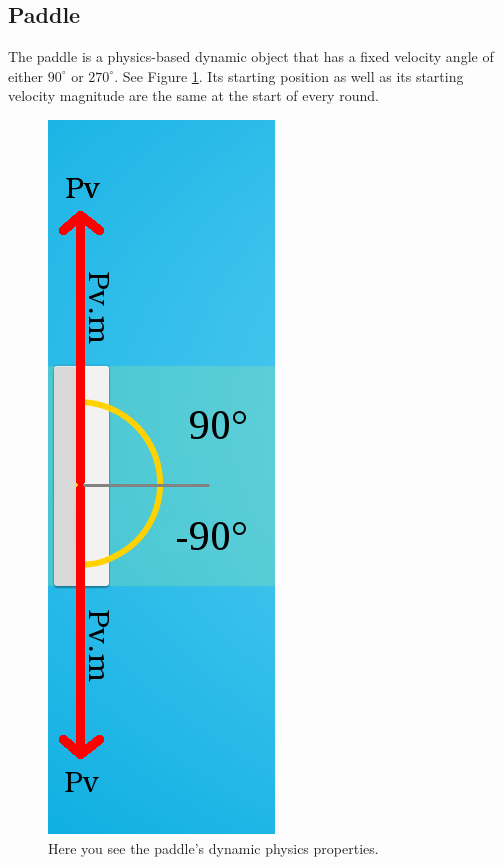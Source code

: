\documentclass[a4paper,10pt]{article}
\begin{document}
\pagebreak

\subsection{Paddle}

The paddle is a physics-based dynamic object that has a fixed velocity angle of either $90^\circ$ or $270^\circ$. See Figure \ref{fig:paddle}. Its starting position as well as its starting velocity magnitude are the same at the start of every round. 

\begin{figure}[H]  
  \centering
  \includegraphics[width=.3\textwidth]{figures/paddle.png}
  \caption{Here you see the paddle's dynamic physics properties.}
  \label{fig:paddle}
\end{figure}
\end{document}
